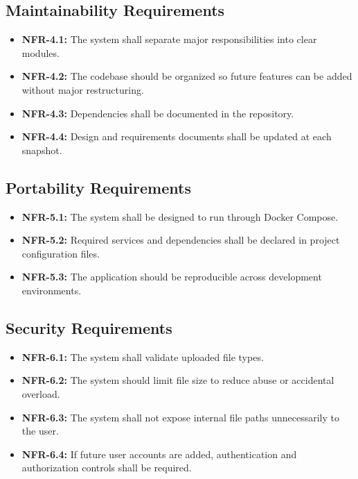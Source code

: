 \documentclass[12pt]{article}
\begin{document}
\subsection{Maintainability Requirements}
\begin{itemize}[noitemsep]
    \item \textbf{NFR-4.1:} The system shall separate major responsibilities into clear modules.
    \item \textbf{NFR-4.2:} The codebase should be organized so future features can be added without major restructuring.
    \item \textbf{NFR-4.3:} Dependencies shall be documented in the repository.
    \item \textbf{NFR-4.4:} Design and requirements documents shall be updated at each snapshot.
\end{itemize}

\subsection{Portability Requirements}
\begin{itemize}[noitemsep]
    \item \textbf{NFR-5.1:} The system shall be designed to run through Docker Compose.
    \item \textbf{NFR-5.2:} Required services and dependencies shall be declared in project configuration files.
    \item \textbf{NFR-5.3:} The application should be reproducible across development environments.
\end{itemize}

\subsection{Security Requirements}
\begin{itemize}[noitemsep]
    \item \textbf{NFR-6.1:} The system shall validate uploaded file types.
    \item \textbf{NFR-6.2:} The system should limit file size to reduce abuse or accidental overload.
    \item \textbf{NFR-6.3:} The system shall not expose internal file paths unnecessarily to the user.
    \item \textbf{NFR-6.4:} If future user accounts are added, authentication and authorization controls shall be required.
\end{itemize}
\end{document}
